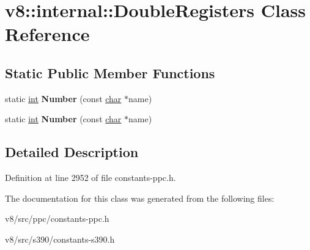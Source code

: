 \hypertarget{classv8_1_1internal_1_1DoubleRegisters}{}\section{v8\+:\+:internal\+:\+:Double\+Registers Class Reference}
\label{classv8_1_1internal_1_1DoubleRegisters}
\subsection*{Static Public Member Functions}
\begin{DoxyCompactItemize}
\item 
\mbox{\label{classv8_1_1internal_1_1DoubleRegisters_a97681106e21ce37ae8a26ea488ef7dda}} 
static \mbox{\hyperlink{classint}{int}} {\bfseries Number} (const \mbox{\hyperlink{classchar}{char}} $\ast$name)
\item 
\mbox{\label{classv8_1_1internal_1_1DoubleRegisters_a97681106e21ce37ae8a26ea488ef7dda}} 
static \mbox{\hyperlink{classint}{int}} {\bfseries Number} (const \mbox{\hyperlink{classchar}{char}} $\ast$name)
\end{DoxyCompactItemize}


\subsection{Detailed Description}


Definition at line 2952 of file constants-\/ppc.\+h.



The documentation for this class was generated from the following files\+:\begin{DoxyCompactItemize}
\item 
v8/src/ppc/constants-\/ppc.\+h\item 
v8/src/s390/constants-\/s390.\+h\end{DoxyCompactItemize}
